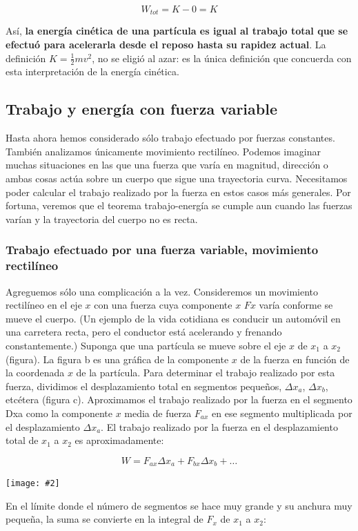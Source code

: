 \documentclass{article}
\newcommand{\newsubsection}[1]{
    \vspace{0.5cm}
    \color{sectionColor}
    \subsection{ #1}
    \color{black}
    \vspace{0.5cm}
}
\newcommand{\newtitle}[1]{
    \color{titleColor}
    \subsubsection{\textbf{#1}}
    \color{black}
}
\newcommand{\bl}[1]{\textbf{#1}}
\newcommand{\ladoALado}[4]{
    \begin{minipage}[t]{#3\textwidth}
        \vspace{0pt}
        #1
    \end{minipage}
    \hfill
    \begin{minipage}[t]{#4\textwidth}
        \vspace{0pt}
        \centering
        \texttt{[image: \#2]}
    \end{minipage}
}
\begin{document}
    \[ W_{tot} = K - 0 = K \]

    \par Así, \bl{la energía cinética de una partícula es igual al trabajo total que se efectuó para acelerarla desde el reposo hasta su rapidez actual}. La definición $K = \frac{1}{2}mv^2$, no se eligió al azar: es la única definición que concuerda con esta interpretación de la energía cinética.

    \newsubsection{Trabajo y energía con fuerza variable}

    \par Hasta ahora hemos considerado sólo trabajo efectuado por fuerzas constantes. También analizamos únicamente movimiento rectilíneo. Podemos imaginar muchas situaciones en las que una fuerza que varía en magnitud, dirección o ambas cosas actúa sobre un cuerpo que sigue una trayectoria curva. Necesitamos poder calcular el trabajo realizado por la fuerza en estos casos más generales. Por fortuna, veremos que el teorema trabajo-energía se cumple aun cuando las fuerzas varían y la trayectoria del cuerpo no es recta.

    \newtitle{Trabajo efectuado por una fuerza variable,
movimiento rectilíneo}

    \ladoALado{
        \par Agreguemos sólo una complicación a la vez. Consideremos un movimiento rectilíneo en el eje $x$ con una fuerza cuya componente $x$ $Fx$ varía conforme se mueve el cuerpo. (Un ejemplo de la vida cotidiana es conducir un automóvil en una carretera recta, pero el conductor está acelerando y frenando constantemente.) Suponga que una partícula se mueve sobre el eje $x$ de $x_1$ a $x_2$ (figura). La figura b es una gráfica de la componente $x$ de la fuerza en función de la coordenada $x$ de la partícula. Para determinar el trabajo realizado por esta fuerza, dividimos el desplazamiento total en segmentos pequeños, $\Delta x_a$, $\Delta x_b$, etcétera (figura c). Aproximamos el trabajo realizado por la fuerza en el segmento Dxa como la componente $x$ media de fuerza $F_{ax}$ en ese segmento multiplicada por el desplazamiento $\Delta x_a$.  El trabajo realizado por la fuerza en el desplazamiento total de $x_1$ a $x_2$ es aproximadamente:

        \[ W = F_{ax} \Delta x_a + F_{bx} \Delta x_b + \ldots \]

    }{img/5.3-1.png}{0.5}{0.5}

    \par En el límite donde el número de segmentos se hace muy grande y su anchura muy pequeña, la suma se convierte en la integral de $F_x$ de $x_1$ a $x_2$:
\end{document}
